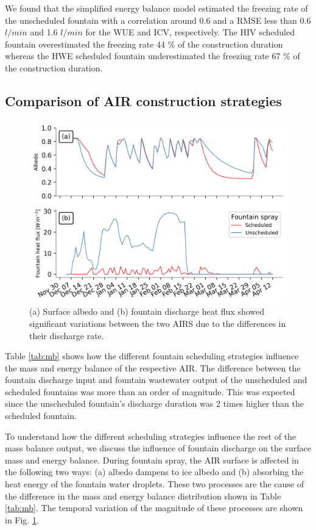 \documentclass[tc, manuscript]{copernicus}
\begin{document}
We found that the simplified energy balance model estimated the freezing rate of the unscheduled fountain with a
correlation around 0.6 and a RMSE less than 0.6 $l/min$ and 1.6  $l/min$ for the WUE and ICV,
respectively. The HIV scheduled fountain overestimated the freezing rate 44 \% of the construction duration
whereas the HWE scheduled fountain underestimated the freezing rate 67 \% of the construction duration.

\subsection{Comparison of AIR construction strategies}

\begin{figure}[t]
\includegraphics[width=12cm]{Figures/dis_processes.png}
\caption{(a) Surface albedo  and (b) fountain discharge heat flux showed significant variations between the two
  AIRS due to the differences in their discharge rate.}
\label{fig:dis_processes}
\end{figure}

Table \ref{tab:mb} shows how the different fountain scheduling strategies influence the mass and energy balance
of the respective AIR. The difference between the fountain discharge input and fountain wastewater output of the
unscheduled and scheduled fountains was more than an order of magnitude. This was expected since the unscheduled
fountain's discharge duration was 2 times higher than the scheduled fountain.

To understand how the different scheduling strategies influence the rest of the mass balance output, we discuss
the influence of fountain discharge on the surface mass and energy balance. During fountain spray, the AIR
surface is affected in the following two ways: (a) albedo dampens to ice albedo and (b) absorbing the heat
energy of the fountain water droplets. These two processes are the cause of the difference in the mass and
energy balance distribution shown in Table \ref{tab:mb}. The temporal variation of the magnitude of these
processes are shown in Fig. \ref{fig:dis_processes}. 
\end{document}
